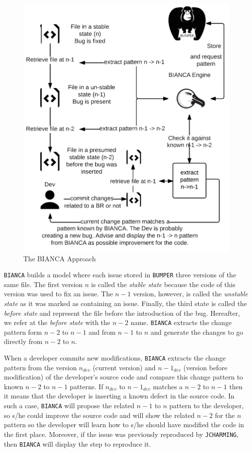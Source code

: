 \begin{figure}[h!]
  \centering
    \includegraphics{media/bianca-approach.png}
    \caption{The BIANCA Approach
    \label{fig:bianca-approach}}
\end{figure}

{\tt BIANCA} builds a model where each issue stored in {\tt BUMPER} three versions of the same file.
The first version $n$ is called the {\it stable state} because the code of this version was used to fix an issue.
The $n-1$ version, however, is called the {\it unstable state} as it was marked as containing an issue.
Finally, the third state is called the {\it before state} and represent the file before the introduction of the bug.
Hereafter, we refer at the {\it before state} with the $n-2$ name.
{\tt BIANCA} extracts the change pattern form $n-2$ to $n-1$ and from $n-1$ to $n$ and generate the changes to go directly from $n-2$ to $n$.

When a developer commits new modifications, {\tt BIANCA} extracts the change pattern from the version $n_{dev}$ (current version) and $n-1_{dev}$ (version before modification) of the developer's source code and compare this change pattern to known $n-2$ to $n-1$ patterns.
If $n_{dev}$ to $n-1_{dev}$ matches a $n-2$ to $n-1$ then it means that the developer is inserting a known defect in the source code.
In such a case, {\tt BIANCA} will propose the related $n-1$ to $n$ pattern to the developer, so s/he could improve the source code and will show the related $n-2$ for the $n$ pattern so the developer will learn how to s/he should have modified the code in the first place. Moreover, if the issue was previously reproduced by {\tt JCHARMING}, then {\tt BIANCA} will display the step to reproduce it.


